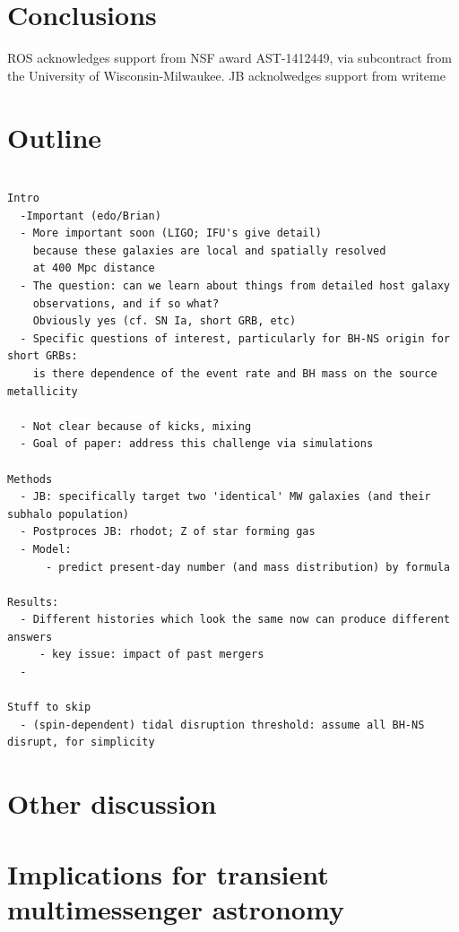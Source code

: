 \documentclass[nofootinbib,twocolumn,prd]{emulateapj}
\newcommand\editremark[1]{{\color{red}#1}}
\begin{document}
\section{Conclusions}





\begin{acknowledgements}
ROS acknowledges support from NSF award AST-1412449, via subcontract from the University of Wisconsin-Milwaukee.
%
JB acknolwedges support  from \editremark{writeme}
\end{acknowledgements}

\appendix

\section{Outline }
\begin{verbatim}

Intro
  -Important (edo/Brian)
  - More important soon (LIGO; IFU's give detail)
    because these galaxies are local and spatially resolved
    at 400 Mpc distance
  - The question: can we learn about things from detailed host galaxy 
    observations, and if so what?
    Obviously yes (cf. SN Ia, short GRB, etc)
  - Specific questions of interest, particularly for BH-NS origin for short GRBs:
    is there dependence of the event rate and BH mass on the source metallicity

  - Not clear because of kicks, mixing
  - Goal of paper: address this challenge via simulations

Methods
  - JB: specifically target two 'identical' MW galaxies (and their subhalo population)
  - Postproces JB: rhodot; Z of star forming gas
  - Model:
      - predict present-day number (and mass distribution) by formula 

Results:
  - Different histories which look the same now can produce different answers
     - key issue: impact of past mergers
  - 

Stuff to skip
  - (spin-dependent) tidal disruption threshold: assume all BH-NS disrupt, for simplicity
\end{verbatim}


\section{Other discussion}


\section{Implications for transient multimessenger astronomy}
\end{document}

